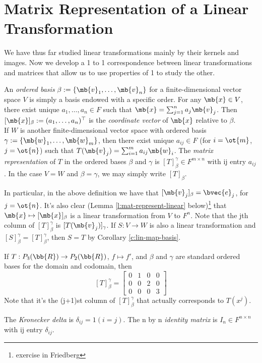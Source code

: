 \section{Matrix Representation of a Linear Transformation}
We have thus far studied linear transformations mainly by their kernels and images. Now we  develop a 1 to 1 correspondence between linear transformations and matrices that allow us to use properties of 1 to study the other.
\begin{defn}
An \emph{ordered basis} $\beta:= \{ \mb{v}_1, \ldots, \mb{v}_n \}$ for a finite-dimensional vector space $V$ is simply a basis endowed with a specific order. For any $\mb{x}\in V$, there exist unique $a_1, \ldots,a_n \in F$ such that $\mb{x}= \sum_{j=1}^na_j \mb{v}_j$.
Then $[ \mb{x}]_\beta:=(a_1, \ldots,a_n)^\top$ is the \emph{coordinate vector} of $\mb{x}$ relative to $\beta$.\\
If $W$ is another finite-dimensional vector space with ordered basis $\gamma:= \{ \mb{w}_1, \ldots, \mb{w}_m \}$, then there exist unique $a_{ij}\in F$ (for $i= \ot{m}$, $j=\ot{n}$) such that $T( \mb{v}_j)= \sum_{i=1}^ma_{ij}\mb{w}_i$.
The \emph{matrix representation} of $T$ in the ordered bases $\beta$ and $\gamma$ is $[T]_\beta^\gamma \in F^{m \times n}$ with ij entry $a_{ij}$. In the case $V=W$ and $\beta= \gamma$, we may simply write $[T]_\beta$.
\end{defn}
In particular, in the above definition we have that $[ \mb{v}_j]_\beta= \bvec{e}_j$, for $j=\ot{n}$. It's also clear (Lemma \ref{l:mat-represent-linear} below)\footnote{exercise in Friedberg} that $\mb{x}\mapsto [ \mb{x}]_\beta$ is a linear transformation from $V$ to $F^n$.
Note that the jth column of $[T]_\beta^\gamma$ is $[T( \mb{v}_j)]_\gamma$. If $S:V \to W$ is also a linear transformation and $[S]_\beta^\gamma =[T]_\beta^\gamma$, then $S=T$ by Corollary \ref{c:lin-map-basis}.
\begin{example}
If $T:P_3( \bb{R}) \to P_2( \bb{R})$, $f \mapsto f'$, and $\beta$ and $\gamma$ are standard ordered bases for the domain and codomain, then
\[ [T]_\beta^\gamma = \begin{bmatrix}0 & 1 & 0 & 0 \\
0 & 0 & 2 & 0 \\
0 & 0 & 0 & 3 \end{bmatrix}\]
Note that it's the (j+1)st column of $[T]_\beta^\gamma$ that actually corresponds to $T(x^j)$.
\end{example}
\begin{defn}
The \emph{Kronecker delta} is $\delta_{ij}=1(i=j)$. The n by n \emph{identity matrix} is $I_n \in F^{n \times n}$ with ij entry $\delta_{ij}$.
\end{defn}

